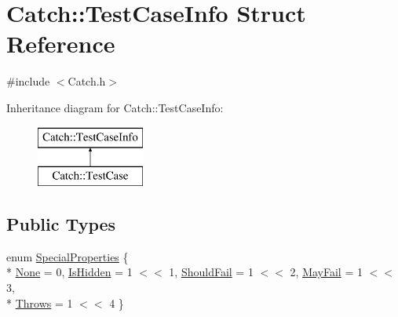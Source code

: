 \hypertarget{struct_catch_1_1_test_case_info}{}\section{Catch\+:\+:Test\+Case\+Info Struct Reference}
\label{struct_catch_1_1_test_case_info}


{\ttfamily \#include $<$Catch.\+h$>$}

Inheritance diagram for Catch\+:\+:Test\+Case\+Info\+:\begin{figure}[H]
\begin{center}
\leavevmode
\includegraphics[height=2.000000cm]{struct_catch_1_1_test_case_info}
\end{center}
\end{figure}
\subsection*{Public Types}
\begin{DoxyCompactItemize}
\item 
enum \hyperlink{struct_catch_1_1_test_case_info_a39b232f74b4a7a6f2183b96759027eac}{Special\+Properties} \{ \\*
\hyperlink{struct_catch_1_1_test_case_info_a39b232f74b4a7a6f2183b96759027eacaf94e9de5f8ec1e53b1aa761ec564b31a}{None} = 0, 
\hyperlink{struct_catch_1_1_test_case_info_a39b232f74b4a7a6f2183b96759027eacaeda53906c14c3973e0980900c132b8f7}{Is\+Hidden} = 1 $<$$<$ 1, 
\hyperlink{struct_catch_1_1_test_case_info_a39b232f74b4a7a6f2183b96759027eacaf9002285bccfc343935958f3953f4c01}{Should\+Fail} = 1 $<$$<$ 2, 
\hyperlink{struct_catch_1_1_test_case_info_a39b232f74b4a7a6f2183b96759027eacadf1873d3271121cb9f52d7df45b416ca}{May\+Fail} = 1 $<$$<$ 3, 
\\*
\hyperlink{struct_catch_1_1_test_case_info_a39b232f74b4a7a6f2183b96759027eaca4704adf89ed7f7ad653d08f99813a974}{Throws} = 1 $<$$<$ 4
 \}
\end{DoxyCompactItemize}
